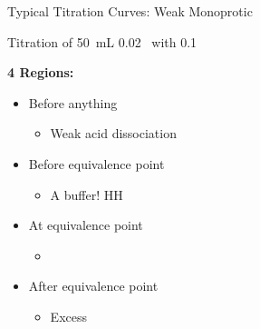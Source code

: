 \documentclass[notes=show]{beamer}
\begin{document}
\begin{frame}[t]{Typical Titration Curves: \alert{Weak} Monoprotic}
	\begin{center}
		Titration of \SI{50}{\milli\liter}
		\SI{0.02}{\Molar}~ with
		\SI{0.1}{\Molar}~
	\end{center}

	\begin{minipage}{0.45\textwidth}
		\centering
		
	\end{minipage}
	\hfill
	\begin{minipage}{0.45\textwidth}
		{\bfseries \alert{4} Regions:}
		\begin{itemize}
			\item \alert{Before anything}
				\begin{itemize}
					\item<2-> Weak acid dissociation
				\end{itemize}
			\item \alert{Before} equivalence point
				\begin{itemize}
					\item<3-> A buffer! \alert{HH}
				\end{itemize}
			\item \alert{At} equivalence point
				\begin{itemize}
					\item<4-> \ch{[NaOH] = [HA]}
				\end{itemize}
			\item \alert{After} equivalence point
				\begin{itemize}
					\item<5-> Excess 
				\end{itemize}
		\end{itemize}
	\end{minipage}
\end{frame}

\end{document}
